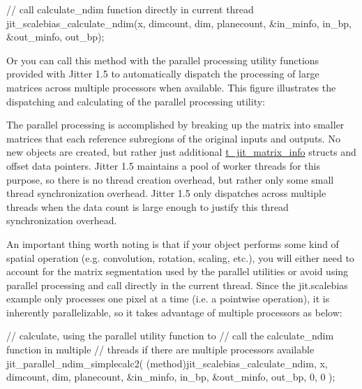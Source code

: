 \begin{DoxyCode}
   // call calculate_ndim function directly in current thread
   jit_scalebias_calculate_ndim(x, dimcount, dim, planecount, 
      &in_minfo, in_bp, &out_minfo, out_bp);
\end{DoxyCode}


Or you can call this method with the parallel processing utility functions provided with Jitter 1.5 to automatically dispatch the processing of large matrices across multiple processors when available. This figure illustrates the dispatching and calculating of the parallel processing utility:



The parallel processing is accomplished by breaking up the matrix into smaller matrices that each reference subregions of the original inputs and outputs. No new objects are created, but rather just additional \hyperlink{structt__jit__matrix__info}{t\_\-jit\_\-matrix\_\-info} structs and offset data pointers. Jitter 1.5 maintains a pool of worker threads for this purpose, so there is no thread creation overhead, but rather only some small thread synchronization overhead. Jitter 1.5 only dispatches across multiple threads when the data count is large enough to justify this thread synchronization overhead.

An important thing worth noting is that if your object performs some kind of spatial operation (e.g. convolution, rotation, scaling, etc.), you will either need to account for the matrix segmentation used by the parallel utilities or avoid using parallel processing and call directly in the current thread. Since the jit.scalebias example only processes one pixel at a time (i.e. a pointwise operation), it is inherently parallelizable, so it takes advantage of multiple processors as below:


\begin{DoxyCode}
   // calculate, using the parallel utility function to
   // call the calculate_ndim function in multiple
   // threads if there are multiple processors available
   jit_parallel_ndim_simplecalc2(
      (method)jit_scalebias_calculate_ndim,
      x, dimcount, dim, planecount, 
      &in_minfo, in_bp, &out_minfo, out_bp,
      0, 0 );
\end{DoxyCode}


